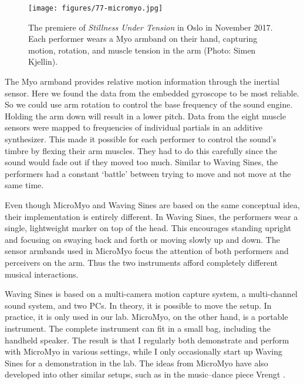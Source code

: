 \begin{figure}[tp]
\centering
\texttt{[image: figures/77-micromyo.jpg]}
\label{fig:sverm-myo-performance}
\caption{The premiere of \emph{Stillness Under Tension} in Oslo in November 2017. Each performer wears a Myo armband on their hand, capturing motion, rotation, and muscle tension in the arm (Photo: Simen Kjellin).
}\label{fig:performance}
\end{figure}

The Myo armband provides relative motion information through the inertial sensor. Here we found the data from the embedded gyroscope to be most reliable. So we could use arm rotation to control the base frequency of the sound engine. Holding the arm down will result in a lower pitch. Data from the eight muscle sensors were mapped to frequencies of individual partials in an additive synthesizer. This made it possible for each performer to control the sound's timbre by flexing their arm muscles. They had to do this carefully since the sound would fade out if they moved too much. Similar to Waving Sines, the performers had a constant `battle' between trying to move and not move at the same time.

Even though MicroMyo and Waving Sines are based on the same conceptual idea, their implementation is entirely different. In Waving Sines, the performers wear a single, lightweight marker on top of the head. This encourages standing upright and focusing on swaying back and forth or moving slowly up and down. The sensor armbands used in MicroMyo focus the attention of both performers and perceivers on the arm. Thus the two instruments afford completely different musical interactions.

Waving Sines is based on a multi-camera motion capture system, a multi-channel sound system, and two PCs. In theory, it is possible to move the setup. In practice, it is only used in our lab. MicroMyo, on the other hand, is a portable instrument. The complete instrument can fit in a small bag, including the handheld speaker. The result is that I regularly both demonstrate and perform with MicroMyo in various settings, while I only occasionally start up Waving Sines for a demonstration in the lab. The ideas from MicroMyo have also developed into other similar setups, such as in the music--dance piece Vrengt \citep{erdem_towards_2020}.

